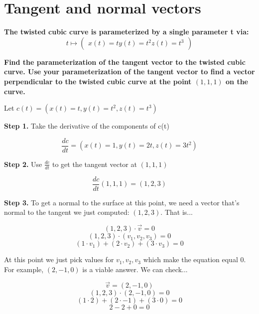 \documentclass{article}
\begin{document}
\section{Tangent and normal vectors}
\textbf{The twisted cubic curve is parameterized by a single parameter t via:} 
\[
t\mapsto\left(\begin{array}{c}x(t) = t  y(t)=t^{2}   z(t)=t^{3}\end{array} \right)
\]

\textbf{Find the parameterization of the tangent vector to the twisted cubic curve. Use your parameterization of the tangent vector to find a vector perpendicular to the twisted cubic curve at the point $(1,1,1)$ on the curve.}\newline

Let $c(t)=\left(x(t) = t, y(t)=t^{2}, z(t)=t^{3}\right)$ \newline

\textbf{Step 1.} Take the derivative of the components of c(t)

\[ \frac{dc}{dt}=\left(x(t) = 1, y(t)= 2t, z(t)=3t^{2}\right) \]

\textbf{Step 2.} Use $\frac{dc}{dt}$ to get the tangent vector at $(1,1,1)$

\[\frac{dc}{dt}(1, 1, 1) = (1,2,3)\]

\textbf{Step 3.} To get a normal to the surface at this point, we need a vector that's normal to the tangent we just computed: $(1,2,3)$. That is...

\[(1,2,3)\cdot\vec{v}=0\]
\[(1,2,3)\cdot(v_1,v_2,v_3)=0\]
\[(1\cdot v_1)+(2\cdot v_2)+(3 \cdot v_3) = 0\]

At this point we just pick values for $v_1, v_2, v_3$ which make the equation equal 0. For example, $(2, -1, 0)$ is a viable answer. We can check...

\[\vec{v} = (2, -1, 0)\]
\[(1,2,3)\cdot(2, -1, 0)=0\]
\[(1\cdot2)+(2\cdot-1)+(3\cdot0)=0\]
\[2-2+0=0\]
\end{document}
